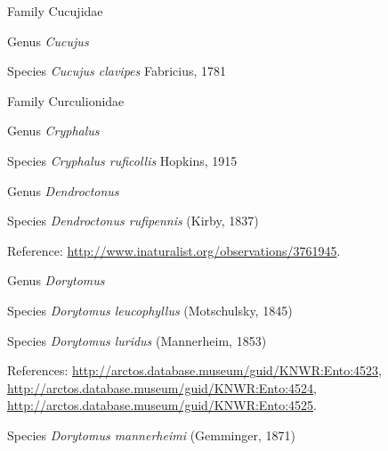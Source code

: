 \documentclass[9pt, article]{memoir}
\begin{document}
\begin{multicols}{2}
\vspace{6pt}\noindent\hspace{24pt}Family Cucujidae


\vspace{6pt}\noindent\hspace{30pt}Genus \textit{Cucujus}


\vspace{6pt}\noindent\hspace{36pt}Species \textit{Cucujus clavipes} Fabricius, 1781


\vspace{6pt}\noindent\hspace{24pt}Family Curculionidae


\vspace{6pt}\noindent\hspace{30pt}Genus \textit{Cryphalus}


\vspace{6pt}\noindent\hspace{36pt}Species \textit{Cryphalus ruficollis} Hopkins, 1915


\vspace{6pt}\noindent\hspace{30pt}Genus \textit{Dendroctonus}


\vspace{6pt}\noindent\hspace{36pt}Species \textit{Dendroctonus rufipennis} (Kirby, 1837)


\vspace{6pt}Reference: 
\url{http://www.inaturalist.org/observations/3761945}.

\vspace{6pt}\noindent\hspace{30pt}Genus \textit{Dorytomus}


\vspace{6pt}\noindent\hspace{36pt}Species \textit{Dorytomus leucophyllus} (Motschulsky, 1845)


\vspace{6pt}\noindent\hspace{36pt}Species \textit{Dorytomus luridus} (Mannerheim, 1853)


\vspace{6pt}References: 
\url{http://arctos.database.museum/guid/KNWR:Ento:4523}, 
\url{http://arctos.database.museum/guid/KNWR:Ento:4524}, 
\url{http://arctos.database.museum/guid/KNWR:Ento:4525}.

\vspace{6pt}\noindent\hspace{36pt}Species \textit{Dorytomus mannerheimi} (Gemminger, 1871)



\end{multicols}
\end{document}
